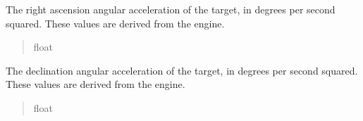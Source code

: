 \documentclass[letterpaper,11pt,english]{sphinxmanual}
\begin{document}
\begin{savenotes}
\begin{fulllineitems}
\begin{savenotes}
\begin{fulllineitems}
\begin{quote}
\begin{description}
\end{description}\end{quote}

\end{fulllineitems}\end{savenotes}


\begin{savenotes}\begin{fulllineitems}
\label{\detokenize{code/opihiexarata.propagate.solution:opihiexarata.propagate.solution.PropagativeSolution.ra_acceleration}}
\pysigstartsignatures
{}
\pysigstopsignatures
\sphinxAtStartPar
The right ascension angular acceleration of the target, in degrees per
second squared. These values are derived from the engine.
\begin{quote}\begin{description}
\sphinxAtStartPar
float

\end{description}\end{quote}

\end{fulllineitems}\end{savenotes}


\begin{savenotes}\begin{fulllineitems}
\label{\detokenize{code/opihiexarata.propagate.solution:opihiexarata.propagate.solution.PropagativeSolution.dec_acceleration}}
\pysigstartsignatures
{}
\pysigstopsignatures
\sphinxAtStartPar
The declination angular acceleration of the target, in degrees per
second squared. These values are derived from the engine.
\begin{quote}\begin{description}
\sphinxAtStartPar
float

\end{description}\end{quote}


\end{fulllineitems}
\end{savenotes}
\end{fulllineitems}
\end{savenotes}
\end{document}
